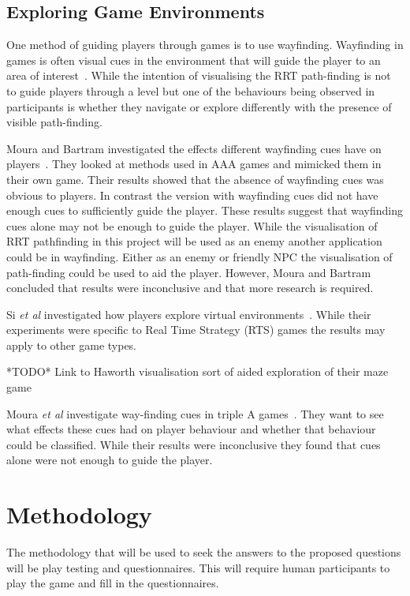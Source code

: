 \documentclass[journal]{IEEEtran}
\begin{document}
\subsection{Exploring Game Environments}
One method of guiding players through games is to use wayfinding. Wayfinding in games is often visual cues in the environment that will guide the player to an area of interest~\cite{si2017, Bacim2008}. While the intention of visualising the RRT path-finding is not to guide players through a level but one of the behaviours being observed in participants is whether they  navigate or explore differently with the presence of visible path-finding. 

Moura and Bartram investigated the effects different wayfinding cues have on players~\cite{moura2014}.  They looked at methods used in AAA games and mimicked them in their own game. Their results showed that the absence of wayfinding cues was obvious to players. In contrast the version with wayfinding cues did not have enough cues to sufficiently guide the player. These results suggest that wayfinding cues alone may not be enough to guide the player. While the visualisation of RRT pathfinding in this project will be used as an enemy another application could be in wayfinding. Either as an enemy or friendly NPC the visualisation of path-finding could be used to aid the player. However, Moura and Bartram concluded that results were inconclusive and that more research is required. 
 
Si \textit{et al} investigated how players explore virtual environments~\cite{si2017}. While their experiments were specific to Real Time Strategy (RTS) games the results may apply to other game types.

*TODO* Link to Haworth visualisation sort of aided exploration of their maze game


Moura \textit{et al} investigate way-finding cues in triple A games~\cite{moura2014}. They want to see what effects these cues had on player behaviour and whether that behaviour could be classified. While their results were inconclusive they found that cues alone were not enough to guide the player.  

\section{Methodology} %
The methodology that will be used to seek the answers to the proposed questions will be play testing and questionnaires. This will require human participants to play the game and fill in the questionnaires. 
\end{document}
